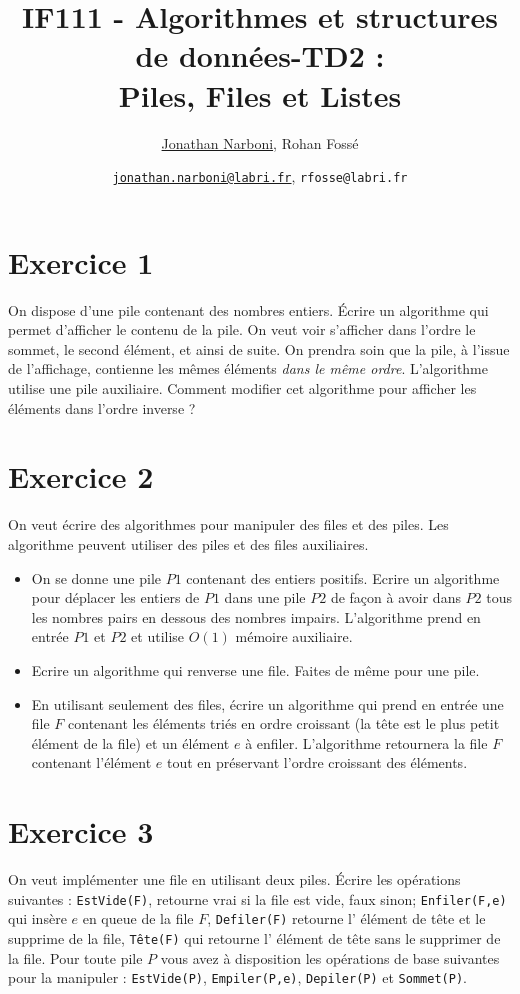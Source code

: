 \documentclass[10pt,a4paper]{article}
\title{IF111 - Algorithmes et structures de données-TD2 :\\ Piles, Files et Listes}
\date{}
\author{\underline{Jonathan Narboni}, Rohan Fossé}
\date{\underline{\texttt{jonathan.narboni@labri.fr}}, \texttt{rfosse@labri.fr}}
\begin{document}
\maketitle

\section*{Exercice 1}
On dispose d'une pile contenant des nombres entiers. Écrire un algorithme qui permet d'afficher le contenu de la pile. On veut voir s'afficher dans l'ordre le sommet, le second élément, et ainsi de suite. On prendra soin que la pile, à l'issue de l'affichage, contienne les mêmes éléments \emph{dans le même ordre}. L'algorithme utilise une pile auxiliaire. Comment modifier cet algorithme pour afficher les éléments dans l'ordre inverse ?




\section*{Exercice 2}
On veut écrire des algorithmes pour manipuler des files et des piles. Les algorithme peuvent utiliser des piles et des files auxiliaires.  
\begin{itemize}
\item On se donne une pile $P1$ contenant des entiers positifs. Ecrire un algorithme pour déplacer les entiers de $P1$ dans une pile $P2$ de façon à avoir dans $P2$ tous les nombres pairs en dessous des nombres impairs. L'algorithme prend en entrée $P1$ et $P2$ et utilise $O(1)$ mémoire auxiliaire.
\item Ecrire un algorithme qui renverse une file. Faites de m\^eme pour une pile.

\item En utilisant seulement des files, écrire un algorithme qui prend en entrée une file $F$ contenant les éléments triés en ordre croissant (la tête est le plus petit élément de la file) et un élément $e$ à enfiler. L'algorithme retournera la file $F$ contenant l'élément $e$ tout en préservant l'ordre croissant des éléments. 

\end{itemize}

\section*{Exercice 3}
On veut implémenter une file en utilisant deux piles. Écrire les opérations suivantes : \texttt{EstVide(F)}, 
retourne vrai si la file est vide, faux sinon; \texttt{Enfiler(F,e)} qui insère $e$ en queue de la file $F$, \texttt{Defiler(F)}
retourne l’ élément de tête et le supprime de la file, \texttt{Tête(F)} qui retourne l’ élément de tête sans le supprimer de la file.
Pour toute pile $P$ vous avez à disposition les opérations de base suivantes pour la manipuler : \texttt{EstVide(P)},  \texttt{Empiler(P,e)}, \texttt{Depiler(P)} et \texttt{Sommet(P)}.
\end{document}
